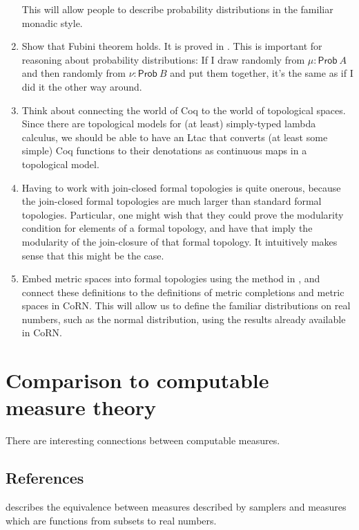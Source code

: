 \documentclass{article}           %
\begin{document}
\begin{enumerate}
This will allow people to describe probability distributions in the familiar monadic style.

\item Show that Fubini theorem holds. It is proved in \cite{vickers2011}. This is important for reasoning about probability distributions: If I draw randomly from $\mu : \mathsf{Prob}\ A$ and then randomly from $\nu : \mathsf{Prob}\ B$ and put them together, it's the same as if I did it the other way around.

\item Think about connecting the world of Coq to the world of topological spaces. Since there are topological models for (at least) simply-typed lambda calculus, we should be able to have an Ltac that converts (at least some simple) Coq functions to their denotations as continuous maps in a topological model. 

\item Having to work with join-closed formal topologies is quite onerous, because the join-closed formal topologies are much larger than standard formal topologies. Particular, one might wish that they could prove the modularity condition for elements of a formal topology, and have that imply the modularity of the join-closure of that formal topology. It intuitively makes sense that this might be the case.

\item Embed metric spaces into formal topologies using the method in \cite{palmgren2007}, and connect these definitions to the definitions of metric completions and metric spaces in CoRN\cite{oconnor2008}. This will allow us to define the familiar distributions on real numbers, such as the normal distribution, using the results already available in CoRN. 
\end{enumerate}

\section{Comparison to computable measure theory}

There are interesting connections between computable measures.

\subsection{References}

\cite{schroder2007} describes the equivalence between measures described by samplers and measures which are functions from subsets to real numbers.
\end{document}
